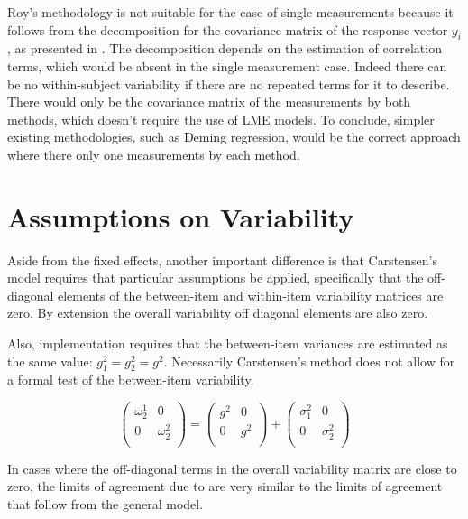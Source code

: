 \documentclass[12pt, a4paper]{report}
\theoremstyle{plain}
\theoremstyle{definition}
\theoremstyle{remark}
\begin{document}
Roy's methodology is not suitable for the case of single measurements because it follows from the decomposition for the covariance matrix of the response vector $y_{i}$, as presented in \citet{hamlett}. The decomposition depends on the estimation of correlation terms, which would be absent in the single measurement case. Indeed there can be no within-subject variability if there are no repeated terms for it to describe. There would only be the covariance matrix of the measurements by both methods, which doesn't require the use of LME models. To conclude, simpler existing methodologies, such as Deming regression, would be the correct approach where there only one measurements by each method.









\section{Assumptions on Variability}

Aside from the fixed effects, another important difference is that Carstensen's model requires that particular assumptions be applied, specifically that the off-diagonal elements of the between-item
and within-item variability matrices are zero. By extension the
overall variability off diagonal elements are also zero.

Also, implementation requires that the between-item variances are
estimated as the same value: $g^2_1 = g^2_2 = g^2$. Necessarily
Carstensen's method does not allow for a formal test of the
between-item variability.

\[\left(\begin{array}{cc}
\omega^1_2  & 0 \\
0 & \omega^2_2 \\
\end{array}  \right)
=  \left(
\begin{array}{cc}
g^2  & 0 \\
0 & g^2 \\
\end{array} \right)+
\left(
\begin{array}{cc}
\sigma^2_1  & 0 \\
0 & \sigma^2_2 \\
\end{array}\right)
\]

In cases where the off-diagonal terms in the overall variability
matrix are close to zero, the limits of agreement due to
\citet{bxc2008} are very similar to the limits of agreement that
follow from the general model.




\bigskip



\end{document}
